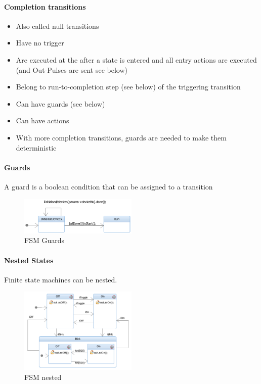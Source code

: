 \hypertarget{completion-transitions}{%
\paragraph{Completion transitions}\label{completion-transitions}}

\begin{itemize}
\tightlist
\item
  Also called null transitions
\item
  Have no trigger
\item
  Are executed at the after a state is entered and all entry actions are
  executed (and Out-Pulses are sent see below)
\item
  Belong to run-to-completion step (see below) of the triggering
  transition
\item
  Can have guards (see below)
\item
  Can have actions
\item
  With more completion transitions, guards are needed to make them
  deterministic
\end{itemize}

\hypertarget{guards}{%
\paragraph{Guards}\label{guards}}

A guard is a boolean condition that can be assigned to a transition

\begin{figure}[H]
\centering
\includegraphics[width=0.5\textwidth]{figures/fsmGuard.png}
\caption{FSM Guards}
\end{figure}

\clearpage
\hypertarget{nested-states}{%
\paragraph{Nested States}\label{nested-states}}

Finite state machines can be nested.

\begin{figure}[H]
\centering
\includegraphics[width=0.5\textwidth]{figures/fsmNested.png}
\caption{FSM nested}
\end{figure}

